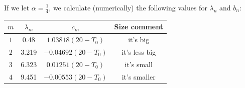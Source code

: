 \begin{solution}
    If we let $\alpha = \frac{1}{4}$, we calculate (numerically) the following values for $\lambda_n$ and $b_n$: 

    \begin{center}
        \begin{tabular}{ ||c c c c|| } 
            \hline
            $m$ & $\lambda_m$ & $c_m$ & Size comment  \\ [0.5ex] 
            \hline\hline
            $1$ & 0.48        & $1.03818 (20 - T_0)$  & it's big \\ 
            \hline
            $2$ & 3.219       & $-0.04692 (20 - T_0)$ & it's less big \\ 
            \hline
            $3$ & 6.323       & $0.01251 (20 - T_0)$  & it's small \\ 
            \hline
            $4$ & 9.451       & $-0.00553 (20 - T_0)$ & it's smaller \\ [1ex]
        \hline
        \end{tabular}
    \end{center}

\end{solution}